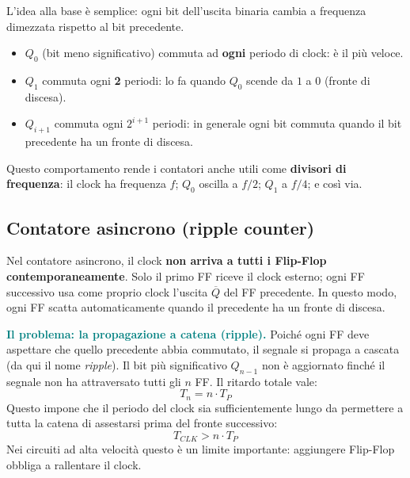 \documentclass[11pt,a4paper]{report}
\begin{document}
\noindent L'idea alla base è semplice: ogni bit dell'uscita binaria cambia a frequenza dimezzata rispetto al bit precedente.
\begin{itemize}[leftmargin=1.5em]
    \item $Q_0$ (bit meno significativo) commuta ad \textbf{ogni} periodo di clock: è il più veloce.
    \item $Q_1$ commuta ogni \textbf{2} periodi: lo fa quando $Q_0$ scende da $1$ a $0$ (fronte di discesa).
    \item $Q_{i+1}$ commuta ogni $2^{i+1}$ periodi: in generale ogni bit commuta quando il bit precedente ha un fronte di discesa.
\end{itemize}
\noindent Questo comportamento rende i contatori anche utili come \textbf{divisori di frequenza}: il clock ha frequenza $f$; $Q_0$ oscilla a $f/2$; $Q_1$ a $f/4$; e così via.

\begin{center}
\end{center}

\subsection{Contatore asincrono (ripple counter)}

Nel contatore asincrono, il clock \textbf{non arriva a tutti i Flip-Flop contemporaneamente}. Solo il primo FF riceve il clock esterno; ogni FF successivo usa come proprio clock l'uscita $\overline{Q}$ del FF precedente. In questo modo, ogni FF scatta automaticamente quando il precedente ha un fronte di discesa.

\medskip
\noindent\textcolor{teal}{\textbf{Il problema: la propagazione a catena (ripple).}} Poiché ogni FF deve aspettare che quello precedente abbia commutato, il segnale si propaga a cascata (da qui il nome \emph{ripple}). Il bit più significativo $Q_{n-1}$ non è aggiornato finché il segnale non ha attraversato tutti gli $n$ FF. Il ritardo totale vale:
\[
T_n = n \cdot T_P
\]
Questo impone che il periodo del clock sia sufficientemente lungo da permettere a tutta la catena di assestarsi prima del fronte successivo:
\[
T_{CLK} > n \cdot T_P
\]
Nei circuiti ad alta velocità questo è un limite importante: aggiungere Flip-Flop obbliga a rallentare il clock.
\end{document}

